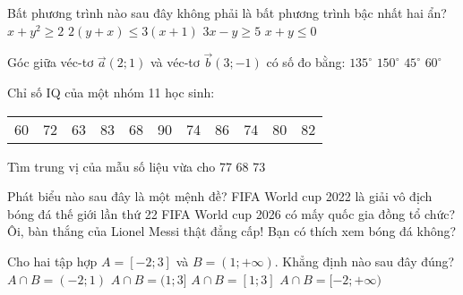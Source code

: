 \begin{ex}%
Bất phương trình nào sau đây không phải là bất phương trình bậc nhất hai ẩn?
\choice
{\True $x+y^2 \geq 2$}
{$2(y+x) \leq 3(x+1)$}
{$3 x-y \geq 5$}
{$x+y \leq 0$}
\end{ex}
\begin{ex}%
Góc giữa véc-tơ $\vec{a}(2 ; 1)$ và véc-tơ $\vec{b}(3 ;-1)$ có số đo bằng:
\choice
{$135^\circ$}
{$150^\circ$}
{\True $45^\circ$}
{$60^\circ$}
\end{ex}
\begin{ex}%
Chỉ số IQ của một nhóm 11 học sinh:
\begin{center}
\begin{tabular}{c c c c c c c c c c c}
	60&72&63&83&68&90&74&86&74&80&82\\
\end{tabular}
\end{center}
Tìm trung vị của mẫu số liệu vừa cho
\choice
{77}
{68}
{73}
{}
\end{ex}
\begin{ex}%
Phát biểu nào sau đây là một mệnh đề?
\choice
{\True FIFA World cup 2022 là giải vô địch bóng đá thế giới lần thứ 22}
{FIFA World cup 2026 có mấy quốc gia đồng tổ chức?}
{Ôi, bàn thắng của Lionel Messi thật đẳng cấp!}
{Bạn có thích xem bóng đá không?}
\end{ex}
\begin{ex}%
Cho hai tập hợp $A=[-2 ; 3]$ và $B=(1 ;+\infty)$. Khẳng định nào sau đây đúng?
\choice
{$A \cap B=(-2 ; 1)$}
{\True $A \cap B=(1 ; 3]$}
{$A \cap B=[1 ; 3]$}
{$A \cap B=[-2 ;+\infty)$}
\loigiai{
Ta có $A \cap B=(1 ; 3]$.
}
\end{ex}
